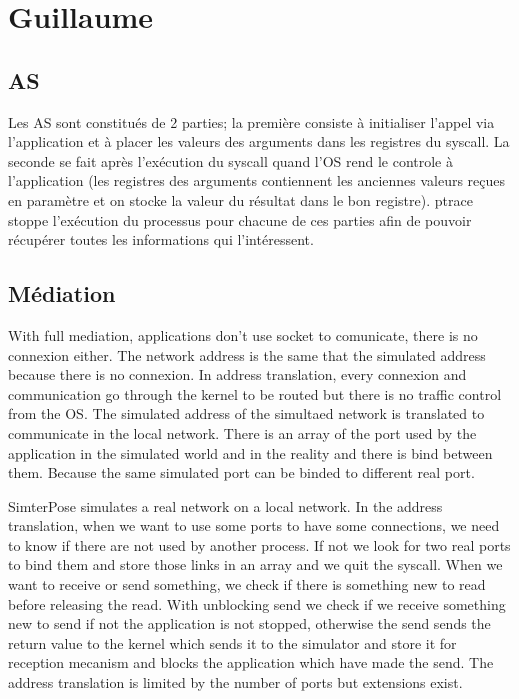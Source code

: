 \documentclass{article}
\begin{document}
\section{Guillaume}
\subsection{AS}
Les AS sont constitués de 2 parties; la première consiste à initialiser l'appel
via l'application et à placer les valeurs des arguments dans les registres du
syscall. La seconde se fait après l'exécution du syscall quand l'OS rend le
controle à l'application (les registres des arguments contiennent les anciennes
valeurs reçues en paramètre et on stocke la valeur du résultat dans le bon
registre). ptrace stoppe l'exécution du processus pour chacune de ces parties
afin de pouvoir récupérer toutes les informations qui l'intéressent.

\subsection{Médiation}
With full mediation, applications don't use socket to comunicate, there is no
connexion either. The network address is the same that the simulated address
because there is no connexion.  In address translation, every connexion and
communication go through the kernel to be routed but there is no traffic control
from the OS. The simulated address of the simultaed network is translated to
communicate in the local network. There is an array of the port used by the
application in the simulated world and in the reality and there is bind between
them. Because the same simulated port can be binded to different real port.

SimterPose simulates a real network on a local network. In the address
translation, when we want to use some ports to have some connections, we need to
know if there are not used by another process. If not we look for two real ports
to bind them and store those links in an array and we quit the syscall. When we
want to receive or send something, we check if there is something new to read
before releasing the read. With unblocking send we check if we receive something
new to send if not the application is not stopped, otherwise the send sends the
return value to the kernel which sends it to the simulator and store it for
reception mecanism and blocks the application which have made the send. The
address translation is limited by the number of ports but extensions exist.
\end{document}
